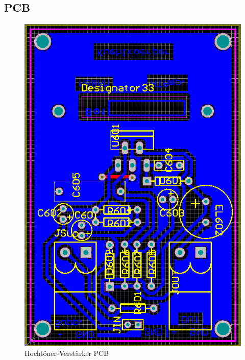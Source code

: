 \subsection{PCB}\label{subsec:4.5.4}


\begin{figure} [H]
	\centering	
	\includegraphics[width=1\textwidth]{img/Print6/HTVerstaerker-PCB.PNG}
	\caption{Hochtöner-Verstärker PCB}
	\label {fig:4.5.4.1}
\end{figure}

